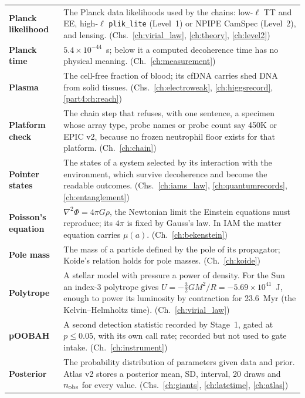 {\begin{longtable}{@{}>{\raggedright\arraybackslash}p{}>{\raggedright\arraybackslash}p{}@{}}
\textbf{Planck likelihood} & The Planck data likelihoods used by the chains: low-$\ell$ TT and EE, high-$\ell$ \texttt{plik\_lite} (Level~1) or NPIPE CamSpec (Level~2), and lensing. {\footnotesize(Chs.~\ref{ch:virial_law}, \ref{ch:theory}, \ref{ch:level2})}\\[1pt]
\textbf{Planck time} & $5.4\times10^{-44}$~s; below it a computed decoherence time has no physical meaning. {\footnotesize(Ch.~\ref{ch:measurement})}\\[1pt]
\textbf{Plasma} & The cell-free fraction of blood; its cfDNA carries shed DNA from solid tissues. {\footnotesize(Chs.~\ref{ch:electroweak}, \ref{ch:higgsrecord}, \ref{part4:ch:reach})}\\[1pt]
\textbf{Platform check} & The chain step that refuses, with one sentence, a specimen whose array type, probe names or probe count say 450K or EPIC v2, because no frozen neutrophil floor exists for that platform. {\footnotesize(Ch.~\ref{ch:chain})}\\[1pt]
\textbf{Pointer states} & The states of a system selected by its interaction with the environment, which survive decoherence and become the readable outcomes. {\footnotesize(Chs.~\ref{ch:iams_law}, \ref{ch:quantumrecords}, \ref{ch:entanglement})}\\[1pt]
\textbf{Poisson's equation} & $\nabla^2\Phi=4\pi G\rho$, the Newtonian limit the Einstein equations must reproduce; its $4\pi$ is fixed by Gauss's law. In IAM the matter equation carries $\mu(a)$. {\footnotesize(Ch.~\ref{ch:bekenstein})}\\[1pt]
\textbf{Pole mass} & The mass of a particle defined by the pole of its propagator; Koide's relation holds for pole masses. {\footnotesize(Ch.~\ref{ch:koide})}\\[1pt]
\textbf{Polytrope} & A stellar model with pressure a power of density. For the Sun an index-3 polytrope gives $U=-\tfrac32GM^2/R=-5.69\times10^{41}$~J, enough to power its luminosity by contraction for 23.6~Myr (the Kelvin--Helmholtz time). {\footnotesize(Ch.~\ref{ch:virial_law})}\\[1pt]
\textbf{pOOBAH} & A second detection statistic recorded by Stage~1, gated at $p\le0.05$, with its own call rate; recorded but not used to gate intake. {\footnotesize(Ch.~\ref{ch:instrument})}\\[1pt]
\textbf{Posterior} & The probability distribution of parameters given data and prior. Atlas v2 stores a posterior mean, SD, interval, 20 draws and $n_{\rm obs}$ for every value. {\footnotesize(Chs.~\ref{ch:giants}, \ref{ch:latetime}, \ref{ch:atlas})}\\[1pt]

\end{longtable}}
